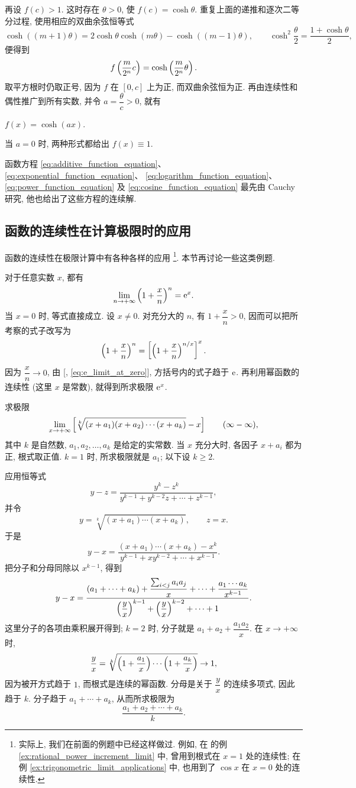 再设 $f(c)>1$. 这时存在 $\theta>0$, 使 $f(c)=\cosh\theta$.
重复上面的递推和逐次二等分过程, 使用相应的双曲余弦恒等式
$$
\cosh((m+1)\theta)
=2\cosh\theta\cosh(m\theta)-\cosh((m-1)\theta),\qquad
\cosh^2\frac\theta2=\frac{1+\cosh\theta}2,
$$
便得到
$$
f\left( \frac{m}{2^n}c \right)=\cosh\left( \frac{m}{2^n}\theta \right).
$$
取平方根时仍取正号, 因为 $f$ 在 $[0,c]$ 上为正, 而双曲余弦恒为正.
再由连续性和偶性推广到所有实数, 并令 $a=\dfrac\theta c>0$, 就有
\begin{center}
$
f(x)=\cosh(ax).
$
\end{center}
当 $a=0$ 时, 两种形式都给出 $f(x)\equiv1$.

函数方程 \eqref{eq:additive_function_equation}、\eqref{eq:exponential_function_equation}、
\eqref{eq:logarithm_function_equation}、\eqref{eq:power_function_equation}
及 \eqref{eq:cosine_function_equation} 最先由 Cauchy 研究,
他也给出了这些方程的连续解.

\subsection{函数的连续性在计算极限时的应用}\label{subsec:77}
函数的连续性在极限计算中有各种各样的应用
\footnote{实际上, 我们在前面的例题中已经这样做过.
例如, 在  的例 \ref{ex:rational_power_increment_limit} 中,
曾用到根式在 $x=1$ 处的连续性;
在例 \ref{ex:trigonometric_limit_applications} 中, 也用到了 $\cos x$ 在 $x=0$ 处的连续性.}.
本节再讨论一些这类例题.

\label{ex:scaled_e_limit}
对于任意实数 $x$, 都有
$$
\lim_{n\to+\infty}\left( 1+\frac xn \right)^n=\mathrm{e}^x.
$$
当 $x=0$ 时, 等式直接成立.
设 $x\neq0$. 对充分大的 $n$, 有 $1+\dfrac xn>0$, 因而可以把所考察的式子改写为
$$
\left( 1+\frac xn \right)^n
=\left[ \left( 1+\frac xn \right)^{n/x} \right]^x.
$$
因为 $\dfrac xn\to0$, 由 [, \eqref{eq:e_limit_at_zero}], 方括号内的式子趋于 $\mathrm{e}$.
再利用幂函数的连续性 (这里 $x$ 是常数), 就得到所求极限 $\mathrm{e}^x$.

\label{ex:root_product_difference_limit}
求极限
$$
\lim_{x\to+\infty}\left[ \sqrt[k]{(x+a_1)(x+a_2)\cdots(x+a_k)}-x \right]
\qquad(\infty-\infty),
$$
其中 $k$ 是自然数, $a_1,a_2,\ldots,a_k$ 是给定的实常数.
当 $x$ 充分大时, 各因子 $x+a_i$ 都为正, 根式取正值.
$k=1$ 时, 所求极限就是 $a_1$; 以下设 $k\geq2$.

应用恒等式
$$
y-z=\frac{y^k-z^k}{y^{k-1}+y^{k-2}z+\cdots+z^{k-1}},
$$
并令
$$
y=\sqrt[k]{(x+a_1)\cdots(x+a_k)},\qquad z=x.
$$
于是
$$
y-x=\frac{(x+a_1)\cdots(x+a_k)-x^k}
{y^{k-1}+xy^{k-2}+\cdots+x^{k-1}}.
$$
把分子和分母同除以 $x^{k-1}$, 得到
$$
y-x=
\frac{(a_1+\cdots+a_k)+\dfrac{\sum_{i<j}a_i a_j}{x}+\cdots+
\dfrac{a_1\cdots a_k}{x^{k-1}}}
{\left( \dfrac yx \right)^{k-1}+\left( \dfrac yx \right)^{k-2}+\cdots+1}.
$$
这里分子的各项由乘积展开得到; $k=2$ 时, 分子就是 $a_1+a_2+\dfrac{a_1a_2}{x}$.
在 $x\to+\infty$ 时,
$$
\frac yx=\sqrt[k]{\left( 1+\frac{a_1}{x} \right)\cdots\left( 1+\frac{a_k}{x} \right)}\to1,
$$
因为被开方式趋于 $1$, 而根式是连续的幂函数.
分母是关于 $\dfrac yx$ 的连续多项式, 因此趋于 $k$.
分子趋于 $a_1+\cdots+a_k$, 从而所求极限为
$$
\frac{a_1+a_2+\cdots+a_k}{k}.
$$

